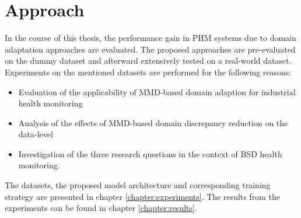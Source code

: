 \section{Approach}
In the course of this thesis, the performance gain in PHM systems due to domain adaptation approaches are evaluated. The proposed approaches are pre-evaluated on the dummy dataset and afterward extensively tested on a real-world dataset. Experiments on the mentioned datasets are performed for the following reasons:
\begin{itemize}
    \item Evaluation of the applicability of MMD-based domain adaption for industrial health monitoring
    \item Analysis of the effects of MMD-based domain discrepancy reduction on the data-level
    \item Investigation of the three research questions in the context of BSD health monitoring.
\end{itemize}

The datasets, the proposed model architecture and corresponding training strategy are presented in chapter \ref{chapter:experiments}. The results from the experiments can be found in chapter \ref{chapter:results}. 
\begin{comment}
\section{Signals used for PHM}
In the work of Pandhare et al. \cite{Pandhare2021} just vibration signals in different spatial directions are measured with sensors, installed at various locations on the BSD. Azamfar et al. \cite{AZAMFAR2020103932} additionally use sound pressure sensors to capture the acoustic level and extract torque and speed signals from the controller. In this thesis also the mechanical power, target electrical power and actual electrical power signals were extracted from the controller. Pandhare et al. and Azamfar et al. record machine data during BSD steady-state motion. In this thesis machine data is collected during different machine excitements (constant speed excitements, direction change excitements and sweep excitement) along the machine tools X-axis. These different signals were evaluated for their suitability for PHM of BSDs


Both Pandhare et al. \cite{Pandhare2021} and Azamfar et al. \cite{AZAMFAR2020103932} feed the data recorded during BSD steady-state motion as one single input to their models. During the phases of constant BSD motion, the amplitude of the signals changess. Azamfar et al. assume that the shorter sequences created by a windowing function just capture limited information about these changes and are therefore not a proper tool for PHM \cite{AZAMFAR2020103932}. In the thesis a windowing function was evaluated for the PHM of BSDs. Windowing functions make the BSD experiments less dependent from specific BSD excitements. When beeing able to check the BSD degradation with short recorded windows, one can make statements about the BSD health status with data redcorded in real time use. Extra experiments 
\end{comment}


